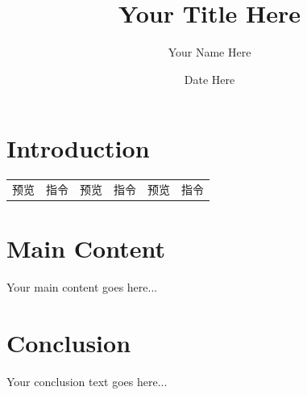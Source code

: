 \documentclass[UTF8]{ctexart}
\title{Your Title Here}
\author{Your Name Here}
\date{Date Here}
\begin{document}
\maketitle

\section{Introduction}
\begin{tabular}{llllll}
    预览 & 指令 & 预览 & 指令 & 预览 & 指令


\end{tabular}
 
\section{Main Content}
Your main content goes here...

\section{Conclusion}
Your conclusion text goes here...
\end{document}
